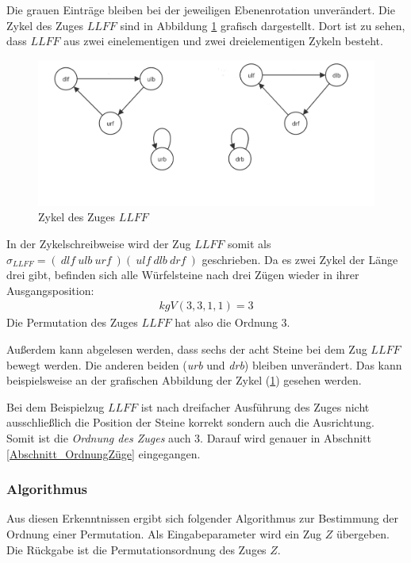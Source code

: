 \documentclass[12pt,a4paper, usenames, dvipsnames]{article}
\theoremstyle{mystyle}
\theoremstyle{definition}
\begin{document}
Die grauen Einträge bleiben bei der jeweiligen Ebenenrotation unverändert. 
Die Zykel des Zuges $LLFF$ sind in Abbildung \ref{Abbildung_ZykelVonLLFF} grafisch dargestellt. Dort ist zu sehen, dass $LLFF$ aus zwei einelementigen und zwei dreielementigen Zykeln besteht.
\begin{figure}[H]
\centering
\includegraphics[scale=0.25]{zykel_LLFF.png}
\caption[Zykel des Zuges $LLFF$]{Zykel des Zuges $LLFF$}
\label{Abbildung_ZykelVonLLFF}
\end{figure}
In der Zykelschreibweise wird der Zug $LLFF$ somit als $\sigma_{LLFF}=( \ \textit{dlf} \ \textit{ulb} \ \textit{urf}\ )(\ \textit{ulf} \ \textit{dlb} \ \textit{drf} \ )$ geschrieben.
Da es zwei Zykel der Länge drei gibt, befinden sich alle Würfelsteine nach drei Zügen wieder in ihrer Ausgangsposition:
\begin{align*}
kgV(3,3,1,1)=3
\end{align*}
Die Permutation des Zuges $LLFF$ hat also die Ordnung $3$.


Außerdem kann abgelesen werden, dass sechs der acht Steine bei dem Zug $LLFF$ bewegt werden. Die anderen beiden (\textit{urb} und \textit{drb}) bleiben unverändert. Das kann beispielsweise an der grafischen Abbildung der Zykel (\ref{Abbildung_ZykelVonLLFF}) gesehen werden.


Bei dem Beispielzug $LLFF$ ist nach dreifacher Ausführung des Zuges nicht ausschließlich die Position der Steine korrekt sondern auch die Ausrichtung. Somit ist die \textit{Ordnung des Zuges} auch 3. Darauf wird genauer in Abschnitt \ref{Abschnitt_OrdnungZüge} eingegangen.

\subsubsection*{Algorithmus}

Aus diesen Erkenntnissen ergibt sich folgender Algorithmus zur Bestimmung der Ordnung einer Permutation. Als Eingabeparameter wird ein Zug $Z$ übergeben. Die Rückgabe ist die Permutationsordnung des Zuges $Z$.
\end{document}

